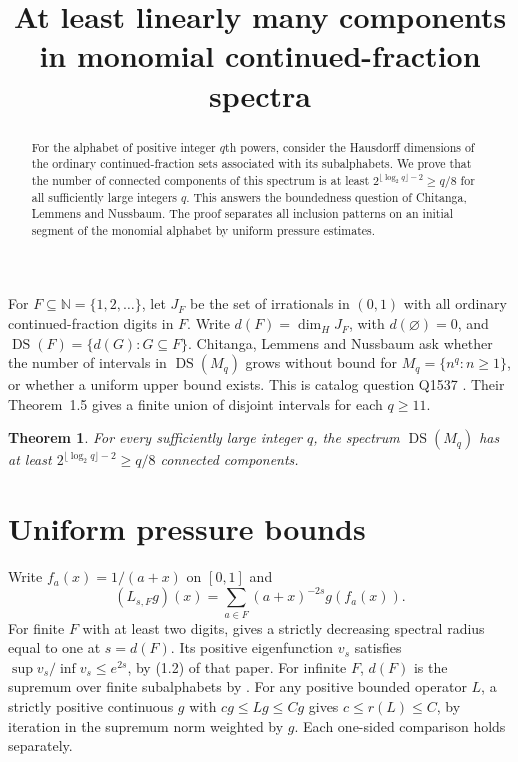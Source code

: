 \documentclass[11pt,a4paper]{amsart}
\title{At least linearly many components in monomial continued-fraction spectra}
\newtheorem{theorem}{Theorem}
\DeclareMathOperator{\DS}{DS}
\begin{document}
\begin{abstract}
For the alphabet of positive integer $q$th powers, consider the Hausdorff dimensions of the ordinary continued-fraction sets associated with its subalphabets. We prove that the number of connected components of this spectrum is at least $2^{\lfloor\log_2q\rfloor-2}\ge q/8$ for all sufficiently large integers $q$. This answers the boundedness question of Chitanga, Lemmens and Nussbaum. The proof separates all inclusion patterns on an initial segment of the monomial alphabet by uniform pressure estimates.
\end{abstract}
\maketitle

For $F\subseteq\mathbb N=\{1,2,\ldots\}$, let $J_F$ be the set of irrationals in $(0,1)$ with all ordinary continued-fraction digits in $F$. Write $d(F)=\dim_H J_F$, with $d(\varnothing)=0$, and $\DS(F)=\{d(G):G\subseteq F\}$. Chitanga, Lemmens and Nussbaum \cite[Section~9]{cln} ask whether the number of intervals in $\DS(M_q)$ grows without bound for $M_q=\{n^q:n\ge1\}$, or whether a uniform upper bound exists. This is catalog question Q1537 \cite{q}. Their Theorem~1.5 gives a finite union of disjoint intervals for each $q\ge11$.

\begin{theorem}
For every sufficiently large integer $q$, the spectrum $\DS(M_q)$ has at least $2^{\lfloor\log_2 q\rfloor-2}\ge q/8$ connected components.
\end{theorem}

\section{Uniform pressure bounds}
Write $f_a(x)=1/(a+x)$ on $[0,1]$ and
\[
(L_{s,F}g)(x)=\sum_{a\in F}(a+x)^{-2s}g(f_a(x)).
\]
For finite $F$ with at least two digits, \cite[Theorem~1.6]{cln} gives a strictly decreasing spectral radius equal to one at $s=d(F)$. Its positive eigenfunction $v_s$ satisfies $\sup v_s/\inf v_s\le e^{2s}$, by (1.2) of that paper. For infinite $F$, $d(F)$ is the supremum over finite subalphabets by \cite[Theorem~2.4]{cln}. For any positive bounded operator $L$, a strictly positive continuous $g$ with $cg\le Lg\le Cg$ gives $c\le r(L)\le C$, by iteration in the supremum norm weighted by $g$. Each one-sided comparison holds separately.
\end{document}
